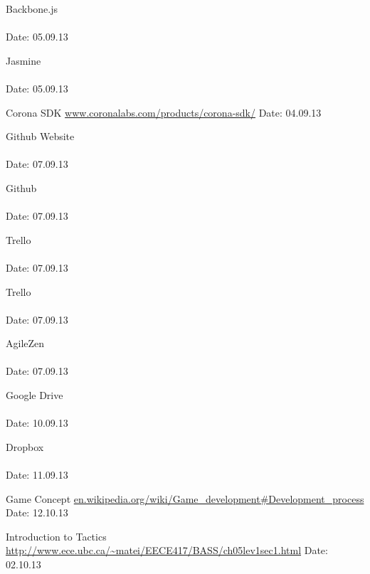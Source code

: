 \begin{thebibliography}{99}
	Backbone.js \\
	\href{http://backbonejs.org/} \\
	Date: 05.09.13

	Jasmine \\ 
	\href{http://pivotal.github.io/jasmine/} \\
	Date: 05.09.13

	Corona SDK\newline
	\href {http://www.coronalabs.com/products/corona-sdk/}{www.coronalabs.com/products/corona-sdk/}\newline
	Date: 04.09.13

	Github Website\\
	\href{https://github.com/} \\
	Date: 07.09.13

	Github \\
	\href{http://en.wikipedia.org/wiki/GitHub} \\
	Date: 07.09.13

	Trello \\
	\href{https://trello.com/} \\
	Date: 07.09.13

	Trello \\
	\href{http://en.wikipedia.org/wiki/Trello} \\
	Date: 07.09.13

	AgileZen \\
	\href{http://www.agilezen.com/} \\
	Date: 07.09.13

	Google Drive \\
	\href{https://drive.google.com} \\
	Date: 10.09.13

	Dropbox \\
	\href{https://www.dropbox.com/home} \\
	Date: 11.09.13

	Game Concept\newline
	\href {en.wikipedia.org/wiki/Game\_development#Development\_process}{en.wikipedia.org/wiki/Game\_development\#Development\_process}\newline
	Date: 12.10.13

	Introduction to Tactics \newline
	\url {http://www.ece.ubc.ca/~matei/EECE417/BASS/ch05lev1sec1.html} \newline
	Date: 02.10.13


\end{thebibliography}
